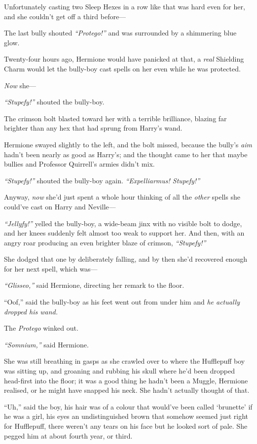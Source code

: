 Unfortunately casting two Sleep Hexes in a row like that was hard even
for her, and she couldn't get off a third before---

The last bully shouted \emph{``Protego!''} and was surrounded by a
shimmering blue glow.

Twenty-four hours ago, Hermione would have panicked at that, a
\emph{real} Shielding Charm would let the bully-boy cast spells on her
even while he was protected.

\emph{Now} she---

\emph{``Stupefy!''} shouted the bully-boy.

The crimson bolt blasted toward her with a terrible brilliance, blazing
far brighter than any hex that had sprung from Harry's wand.

Hermione swayed slightly to the left, and the bolt missed, because the
bully's \emph{aim} hadn't been nearly as good as Harry's; and the
thought came to her that maybe bullies and Professor Quirrell's armies
didn't mix.

\emph{``Stupefy!''} shouted the bully-boy again. \emph{``Expelliarmus!
Stupefy!''}

Anyway, \emph{now} she'd just spent a whole hour thinking of all the
\emph{other} spells she could've cast on Harry and Neville---

\emph{``Jellyfy!''} yelled the bully-boy, a wide-beam jinx with no
visible bolt to dodge, and her knees suddenly felt almost too weak to
support her. And then, with an angry roar producing an even brighter
blaze of crimson, \emph{``Stupefy!''}

She dodged that one by deliberately falling, and by then she'd recovered
enough for her next spell, which was---

\emph{``Glisseo,''} said Hermione, directing her remark to the floor.

``Oof,'' said the bully-boy as his feet went out from under him and
\emph{he actually dropped his wand.}

The \emph{Protego} winked out.

\emph{``Somnium,''} said Hermione.

She was still breathing in gasps as she crawled over to where the
Hufflepuff boy was sitting up, and groaning and rubbing his skull where
he'd been dropped head-first into the floor; it was a good thing he
hadn't been a Muggle, Hermione realised, or he might have snapped his
neck. She hadn't actually thought of that.

``Uh,'' said the boy, his hair was of a colour that would've been called
`brunette' if he was a girl, his eyes an undistinguished brown that
somehow seemed just right for Hufflepuff, there weren't any tears on his
face but he looked sort of pale. She pegged him at about fourth year, or
third.

